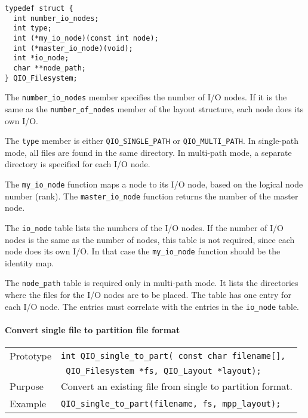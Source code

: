 \documentclass{article}
\begin{document}
%
\begin{verbatim}
typedef struct {
  int number_io_nodes;
  int type;                         
  int (*my_io_node)(const int node);
  int (*master_io_node)(void);      
  int *io_node;                     
  char **node_path;
} QIO_Filesystem;
\end{verbatim}
%

The \verb|number_io_nodes| member specifies the number of I/O nodes.
If it is the same as the \verb|number_of_nodes| member of the layout
structure, each node does its own I/O.  

The \verb|type| member is either \verb|QIO_SINGLE_PATH| or
\verb|QIO_MULTI_PATH|.  In single-path mode, all files are found in
the same directory.  In multi-path mode, a separate directory is
specified for each I/O node.

The \verb|my_io_node| function maps a node to its I/O node, based on
the logical node number (rank).  The \verb|master_io_node| function
returns the number of the master node.

The \verb|io_node| table lists the numbers of the I/O nodes.  If the
number of I/O nodes is the same as the number of nodes, this table is
not required, since each node does its own I/O.  In that case the
\verb|my_io_node| function should be the identity map.

The \verb|node_path| table is required only in multi-path mode.  It
lists the directories where the files for the I/O nodes are to be
placed.  The table has one entry for each I/O node.  The entries must
correlate with the entries in the \verb|io_node| table.

\paragraph{Convert single file to partition file format}

\begin{flushleft}
  \begin{tabular}{|l|l|}
  \hline
  Prototype      & \verb|int QIO_single_to_part( const char filename[], | \\
                 & \verb| QIO_Filesystem *fs, QIO_Layout *layout);| \\
  Purpose        & Convert an existing file from single to partition format. \\
\hline
  Example  & \verb|QIO_single_to_part(filename, fs, mpp_layout);|\\
   \hline
 \end{tabular}
\end{flushleft}
%
\end{document}

